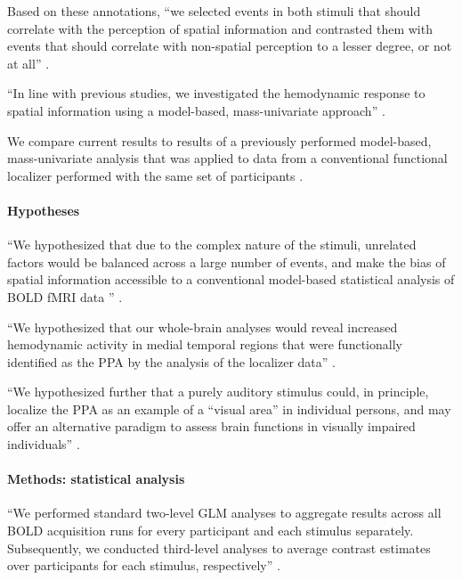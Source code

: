 Based on these annotations, ``we selected events in both stimuli that should
correlate with the perception of spatial information and contrasted them with
events that should correlate with non-spatial perception to a lesser degree, or
not at all'' \citep{haeusler2022processing}.

``In line with previous studies, we investigated the hemodynamic response to
spatial information using a model-based, mass-univariate approach''
\citep{haeusler2022processing}.

We compare current results to results of a previously performed model-based,
mass-univariate analysis that was applied to data from a conventional functional
localizer performed with the same set of participants
\citep{sengupta2016extension}.



\paragraph{Hypotheses}

``We hypothesized that due to the complex nature of the stimuli, unrelated
factors would be balanced across a large number of events, and make the bias of
spatial information accessible to a conventional model-based statistical
analysis of BOLD fMRI data '' \citep{haeusler2022processing}.

``We hypothesized that our whole-brain analyses would reveal increased
hemodynamic activity in medial temporal regions that were functionally
identified as the PPA by the analysis of the localizer data''
\citep{haeusler2022processing}.

``We hypothesized further that a purely auditory stimulus could, in principle,
localize the PPA as an example of a ``visual area'' in individual persons,
%
and may offer an alternative paradigm to assess brain functions in visually
impaired individuals'' \citep{haeusler2022processing}.


\paragraph{Methods: statistical analysis}

``We performed standard two-level GLM analyses to aggregate results across all
BOLD acquisition runs for every participant and each stimulus separately.
Subsequently, we conducted third-level analyses to average contrast estimates
over participants for each stimulus, respectively''
\citep{haeusler2022processing}.

